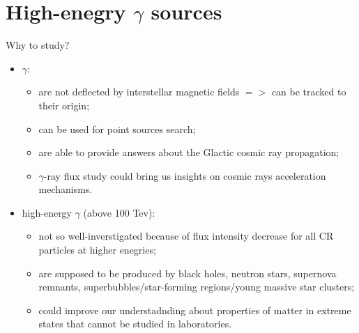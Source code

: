 
\begin{frame}
\titlepage
\end{frame}

\section{High-enegry $\gamma$ sources}

\begin{frame}{Why to study?}
  \begin{itemize}
    \item $\gamma$:
    \begin{itemize}
	\item are not deflected by interstellar magnetic fields $=>$ can be tracked to their origin;
	\item can be used for point sources search;
	\item are able to provide answers about the Glactic cosmic ray propagation;
	\item $\gamma$-ray flux study could bring us insights on cosmic rays acceleration mechanisms.
    \end{itemize}
    \item high-energy $\gamma$ (above 100 Tev):
    \begin{itemize}
	\item not so well-inverstigated because of flux intensity decrease for all CR particles at higher enegries;
	\item are supposed to be produced by black holes, neutron stars, supernova remnants, superbubbles/star-forming
	regions/young massive star clusters;
	\item could improve our understadnding about properties of matter in extreme states that cannot be studied in laboratories.
    \end{itemize}
  \end{itemize}
\end{frame}

